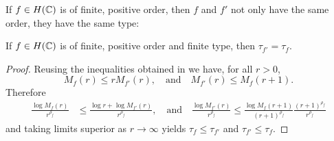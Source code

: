 
If $f \in H(\mathbb{C})$ is of finite, positive order, then $f$ and $f'$ not only have the same order, they have the same type:

\begin{proposition} \label{prop:type-derivative}
    If $f \in H(\mathbb{C})$ is of finite, positive order and finite type, then $\tau_{f'} = \tau_f$.
\end{proposition}

\begin{proof}
    Reusing the inequalities obtained in  we have, for all $r > 0$,
    \begin{equation*}
        M_f(r) \leq r M_{f'}(r), \quad \textrm{and} \quad M_{f'}(r) \leq M_f(r+1).
    \end{equation*}
    Therefore
    \begin{align*}
        \frac{\log M_f(r)}{r^{\rho_f}} &\leq \frac{\log r + \log M_{f'}(r)}{r^{\rho_f}}, \quad \textrm{and} \quad \frac{\log M_{f'}(r)}{r^{\rho_f}} \leq \frac{\log M_{f}(r+1)}{(r+1)^{\rho_f}} \frac{(r+1)^{\rho_f}}{r^{\rho_f}}
    \end{align*}
    and taking limits superior as $r \to \infty$ yields $\tau_f \leq \tau_{f'}$ and $\tau_{f'} \leq \tau_f$.
\end{proof}